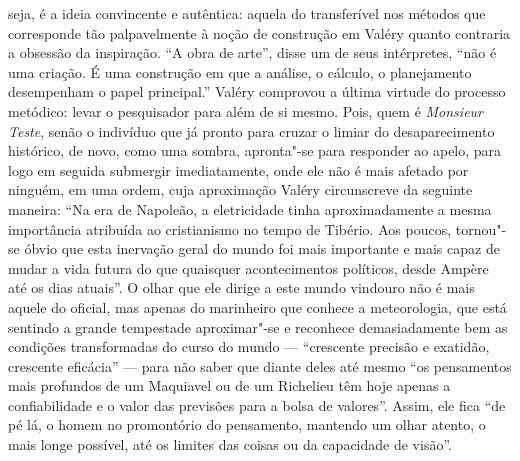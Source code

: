 seja, é a ideia convincente e autêntica: aquela do transferível nos
métodos que corresponde tão palpavelmente à noção de construção em
Valéry quanto contraria a obsessão da inspiração. ``A obra de arte'',
disse um de seus intérpretes, ``não é uma criação. É uma construção em
que a análise, o cálculo, o planejamento desempenham o papel principal.''
Valéry comprovou a última virtude do processo metódico: levar o
pesquisador para além de si mesmo. Pois, quem é \emph{Monsieur Teste}, senão o
indivíduo que já pronto para cruzar o limiar do desaparecimento
histórico, de novo, como uma sombra, apronta"-se para responder ao apelo,
para logo em seguida submergir imediatamente, onde ele não é mais
afetado por ninguém, em uma ordem, cuja aproximação Valéry circunscreve
da seguinte maneira: ``Na era de Napoleão, a eletricidade tinha
aproximadamente a mesma importância atribuída ao cristianismo no tempo
de Tibério. Aos poucos, tornou"-se óbvio que esta inervação geral do
mundo foi mais importante e mais capaz de mudar a vida futura do que
quaisquer acontecimentos políticos, desde Ampère até os dias atuais''. O olhar que
ele dirige a este mundo vindouro não é mais aquele do oficial, mas
apenas do marinheiro que conhece a meteorologia, que está sentindo a
grande tempestade aproximar"-se e reconhece demasiadamente bem as condições
transformadas do curso do mundo --- ``crescente precisão e exatidão,
crescente eficácia'' --- para não saber que diante deles até mesmo ``os
pensamentos mais profundos de um Maquiavel ou de um Richelieu têm hoje apenas
a confiabilidade e o valor das previsões para a bolsa de valores''. Assim,
ele fica ``de pé lá, o homem no promontório do pensamento, mantendo um
olhar atento, o mais longe possível, até os limites das coisas ou da
capacidade de visão''.
